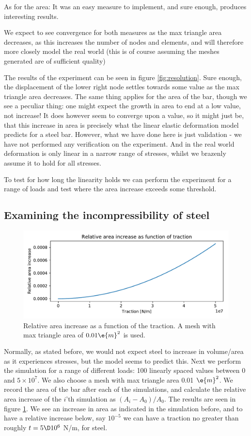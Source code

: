 \documentclass[sigconf]{acmart}
\begin{document}
As for the area: It was an easy measure to implement, and sure enough, produces interesting results.

We expect to see convergence for both measures as the max triangle area decreases, as this increases the number of nodes and elements, and will therefore more closely model the real world (this is of course assuming the meshes generated are of sufficient quality)

The results of the experiment can be seen in figure \ref{fig:resolution}. Sure enough, the displacement of the lower right node settles towards some value as the max triangle area decreases. The same thing applies for the area of the bar, though we see a peculiar thing: one might expect the growth in area to end at a low value, not increase! It does however seem to converge upon a value, so it might just be, that this increase in area is precisely what the linear elastic deformation model predicts for a steel bar. However, what we have done here is just validation - we have not performed any verification on the experiment. And in the real world deformation is only linear in a narrow range of stresses, whilst we brazenly assume it to hold for all stresses.

To test for how long the linearity holds we can perform the experiment for a range of loads and test where the area increase exceeds some threshold.


\subsection{Examining the incompressibility of steel}
\begin{figure}
	\centering
	\includegraphics[width=\linewidth]{ex_loads.pdf}
	\caption{Relative area increase as a function of the traction. A mesh with max triangle area of $ 0.01 \e{m}^2 $ is used.}
	\label{fig:loads}
\end{figure}
Normally, as stated before, we would not expect steel to increase in volume/area as it experiences stresses, but the model seems to predict this. Next we perform the simulation for a range of different loads: 100 linearly spaced values between 0 and $ 5\times 10^7 $. We also choose a mesh with max triangle area 0.01 $ \e{m}^2 $. We record the area of the bar after each of the simulations, and calculate the relative area increase of the $ i $'th simulation as $ (A_i-A_0)/A_0 $. The results are seen in figure \ref{fig:loads}.
We see an increase in area as indicated in the simulation before, and to have a relative increase below, say $ 10^{-5} $ we can have a traction no greater than roughly $ t=5\D 10^6 $ N/m, for steel.
\end{document}
